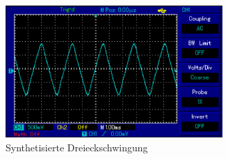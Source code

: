 \begin{figure}[H]
  \centering
  \includegraphics[height=5cm]{dreieck.PNG}
  \caption{Synthetisierte Dreieckschwingung}
  \label{fig:dreieck}
\end{figure}
